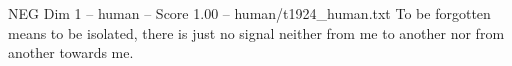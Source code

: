\begin{textsample}{NEG Dim 1 – human – Score 1.00 – human/t1924\_human.txt}  \label{ex:f1_neg_013}
To be forgotten means to be isolated, there is just no signal neither from me to another nor from another towards me.

\end{textsample}
